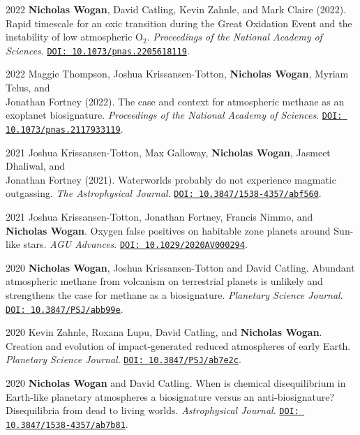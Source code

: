 \documentclass{article}
\begin{document}
\begin{cvlist}
\item[2022]
  \textbf{Nicholas Wogan}, David Catling, Kevin Zahnle, and Mark Claire (2022). Rapid timescale for an oxic transition during the Great Oxidation Event and the instability of low atmospheric O$_2$. \emph{Proceedings of the National Academy of Sciences}. \href{https://doi.org/10.1073/pnas.2205618119}{\nolinkurl{DOI: 10.1073/pnas.2205618119}}.
\item[2022]
  Maggie Thompson, Joshua Krissansen-Totton, \textbf{Nicholas Wogan}, Myriam Telus, and \\Jonathan Fortney (2022). The case and context for atmospheric methane as an exoplanet biosignature. \emph{Proceedings of the National Academy of Sciences}. \href{https://doi.org/10.1073/pnas.2117933119}{\nolinkurl{DOI: 10.1073/pnas.2117933119}}.
\item[2021]
  Joshua Krissansen-Totton, Max Galloway, \textbf{Nicholas Wogan}, Jasmeet Dhaliwal, and \\Jonathan Fortney (2021). Waterworlds probably do not experience magmatic outgassing. \emph{The Astrophysical Journal}. \href{https://doi.org/10.3847/1538-4357/abf560}{\nolinkurl{DOI: 10.3847/1538-4357/abf560}}.
\item[2021]
  Joshua Krissansen-Totton, Jonathan Fortney, Francis Nimmo, and \textbf{Nicholas Wogan}. Oxygen false positives on habitable zone planets around Sun-like stars. \emph{AGU Advances}. \href{https://doi.org/10.1029/2020AV000294}{\nolinkurl{DOI: 10.1029/2020AV000294}}.
\item[2020]
  \textbf{Nicholas Wogan}, Joshua Krissansen-Totton and David Catling. Abundant atmospheric methane from volcanism on terrestrial planets is unlikely and strengthens the case for methane as a biosignature. \emph{Planetary Science Journal}. \href{https://doi.org/10.3847/PSJ/abb99e}{\nolinkurl{DOI: 10.3847/PSJ/abb99e}}.
\item[2020]
  Kevin Zahnle, Roxana Lupu, David Catling, and \textbf{Nicholas Wogan}. Creation and evolution of impact-generated reduced atmospheres of early Earth. \emph{Planetary Science Journal}. \href{https://doi.org/10.3847/PSJ/ab7e2c}{\nolinkurl{DOI: 10.3847/PSJ/ab7e2c}}.
\item[2020]
  \textbf{Nicholas Wogan} and David Catling. When is chemical disequilibrium in Earth-like planetary atmospheres a biosignature versus an anti-biosignature? Disequilibria from dead to living worlds. \emph{Astrophysical Journal}. \href{https://doi.org/10.3847/1538-4357/ab7b81}{\nolinkurl{DOI: 10.3847/1538-4357/ab7b81}}.
\end{cvlist}
\end{document}
